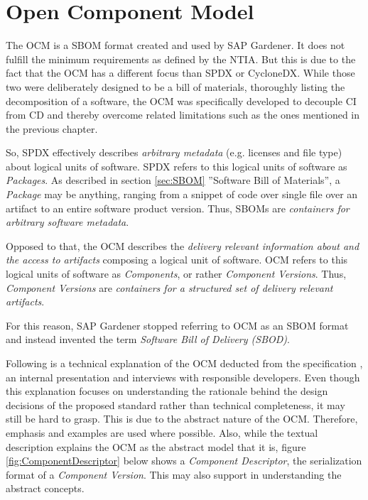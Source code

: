 \section{Open Component Model} \label{sec:Open Component Model}
The OCM is a SBOM format created and used by SAP Gardener. It does not fulfill the minimum requirements as defined by the NTIA. But this is due to the fact that the OCM has a different focus than SPDX or CycloneDX. While those two were deliberately designed to be a bill of materials, thoroughly listing the decomposition of a software, the OCM was specifically developed to decouple CI from CD and thereby overcome related limitations such as the ones mentioned in the previous chapter.\par 
So, SPDX effectively describes \emph{arbitrary metadata} (e.g. licenses and file type) about logical units of software. SPDX refers to this logical units of software as \emph{Packages}. As described in section \ref{sec:SBOM} ''Software Bill of Materials'', a \emph{Package} may be anything, ranging from a snippet of code over single file over an artifact to an entire software product version. Thus, SBOMs are \emph{containers for arbitrary software metadata}.\par
Opposed to that, the OCM describes the \emph{delivery relevant information about and the access to artifacts} composing a logical unit of software. OCM refers to this logical units of software as \emph{Components}, or rather \emph{Component Versions}. Thus, \emph{Component Versions} are  \emph{containers for a structured set of delivery relevant artifacts}.\par 
For this reason, SAP Gardener stopped referring to OCM as an SBOM format and instead invented the term \emph{Software Bill of Delivery (SBOD)}.\par
Following is a technical explanation of the OCM deducted from the specification \cite{OCMSpec}, an internal presentation \cite{OCMInternalPresentation} and interviews with responsible developers. Even though this explanation focuses on understanding the rationale behind the design decisions of the proposed standard rather than technical completeness, it may still be hard to grasp. This is due to the abstract nature of the OCM. Therefore, emphasis and examples are used where possible. Also, while the textual description explains the OCM as the abstract model that it is, figure \ref{fig:ComponentDescriptor} below shows a \emph{Component Descriptor}, the serialization format of a \emph{Component Version}. This may also support in understanding the abstract concepts.

